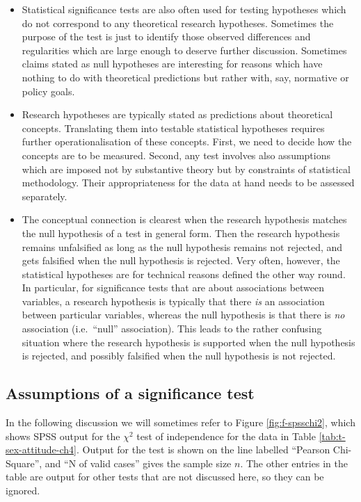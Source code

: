 \documentclass[11pt,a4paper,openany]{book}
\begin{document}
\begin{itemize}
\item
  Statistical significance tests are also often used for testing
  hypotheses which do not correspond to any theoretical research
  hypotheses. Sometimes the purpose of the test is just to identify
  those observed differences and regularities which are large enough to
  deserve further discussion. Sometimes claims stated as null hypotheses
  are interesting for reasons which have nothing to do with theoretical
  predictions but rather with, say, normative or policy goals.
\item
  Research hypotheses are typically stated as predictions about
  theoretical concepts. Translating them into testable statistical
  hypotheses requires further operationalisation of these concepts.
  First, we need to decide how the concepts are to be measured. Second,
  any test involves also assumptions which are imposed not by
  substantive theory but by constraints of statistical methodology.
  Their appropriateness for the data at hand needs to be assessed
  separately.
\item
  The conceptual connection is clearest when the research hypothesis
  matches the null hypothesis of a test in general form. Then the
  research hypothesis remains unfalsified as long as the null hypothesis
  remains not rejected, and gets falsified when the null hypothesis is
  rejected. Very often, however, the statistical hypotheses are for
  technical reasons defined the other way round. In particular, for
  significance tests that are about associations between variables, a
  research hypothesis is typically that there \emph{is} an association
  between particular variables, whereas the null hypothesis is that
  there is \emph{no} association (i.e.~``null'' association). This leads
  to the rather confusing situation where the research hypothesis is
  supported when the null hypothesis is rejected, and possibly falsified
  when the null hypothesis is not rejected.
\end{itemize}

\subsection{Assumptions of a significance
test}\label{ss-tables-chi2test-ass}

In the following discussion we will sometimes refer to Figure
\ref{fig:f-spsschi2}, which shows SPSS output for the \(\chi^{2}\) test
of independence for the data in Table \ref{tab:t-sex-attitude-ch4}.
Output for the test is shown on the line labelled ``Pearson
Chi-Square'', and ``N of valid cases'' gives the sample size \(n\). The
other entries in the table are output for other tests that are not
discussed here, so they can be ignored.
\end{document}
